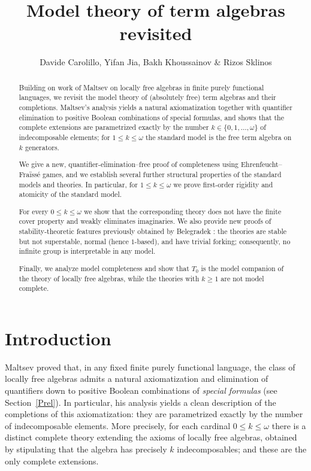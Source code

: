 \documentclass[a4paper,11pt]{article}
\title{Model theory of term algebras revisited}
\date{}
\author{Davide Carolillo, Yifan Jia, Bakh Khoussainov \& Rizos Sklinos}
\begin{document}
\maketitle

\begin{abstract}
Building on work of Maltsev \cite{Malcev71} on locally free algebras in finite purely functional languages, we revisit the model theory of (absolutely free) term algebras and their completions. Maltsev's analysis yields a natural axiomatization together with quantifier elimination to positive Boolean combinations of special formulas, and shows that the complete extensions are parametrized exactly by the number \(k\in\{0,1,\dots,\omega\}\) of indecomposable elements; for \(1\le k\le\omega\) the standard model is the free term algebra on \(k\) generators. 

We give a new, quantifier-elimination--free proof of completeness using Ehrenfeucht--Fra\"iss\'e games, and we establish several further structural properties of the standard models and theories. In particular, for \(1\le k\le\omega\) we prove first-order rigidity and atomicity of the standard model. 

For every \(0\le k\le\omega\) we show that the corresponding theory does not have the finite cover property and weakly eliminates imaginaries. We also provide new proofs of stability-theoretic features previously obtained by Belegradek \cite{Belegradek1988LocallyFree}: the theories are stable but not superstable, normal (hence \(1\)-based), and have trivial forking; consequently, no infinite group is interpretable in any model. 

Finally, we analyze model completeness and show that \(T_0\) is the model companion of the theory of locally free algebras, while the theories with \(k\ge 1\) are not model complete.
\end{abstract}

\section{Introduction} 
Maltsev proved \cite{Malcev71} that, in any fixed finite purely functional language, the class of locally free algebras admits a natural axiomatization and elimination of quantifiers down to positive Boolean combinations of \emph{special formulas} (see Section~\ref{Prel}). In particular, his analysis yields a clean description of the completions of this axiomatization: they are parametrized exactly by the number of indecomposable elements. More precisely, for each cardinal \(0\leq k\leq \omega\) there is a distinct complete theory extending the axioms of locally free algebras, obtained by stipulating that the algebra has precisely \(k\) indecomposables; and these are the only complete extensions.
\end{document}
